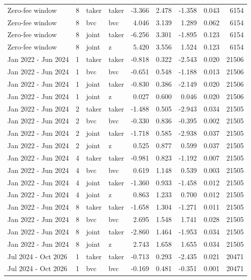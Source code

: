 \begin{tabular}{lrllrrrrr}
Zero-fee window & 8 & taker & taker & -3.366 & 2.478 & -1.358 & 0.043 & 6154 \\
Zero-fee window & 8 & bvc & bvc & 4.046 & 3.139 & 1.289 & 0.062 & 6154 \\
Zero-fee window & 8 & joint & taker & -6.256 & 3.301 & -1.895 & 0.123 & 6154 \\
Zero-fee window & 8 & joint & z & 5.420 & 3.556 & 1.524 & 0.123 & 6154 \\
Jan 2022 - Jun 2024 & 1 & taker & taker & -0.818 & 0.322 & -2.543 & 0.020 & 21506 \\
Jan 2022 - Jun 2024 & 1 & bvc & bvc & -0.651 & 0.548 & -1.188 & 0.013 & 21506 \\
Jan 2022 - Jun 2024 & 1 & joint & taker & -0.830 & 0.386 & -2.149 & 0.020 & 21506 \\
Jan 2022 - Jun 2024 & 1 & joint & z & 0.027 & 0.600 & 0.046 & 0.020 & 21506 \\
Jan 2022 - Jun 2024 & 2 & taker & taker & -1.488 & 0.505 & -2.943 & 0.034 & 21505 \\
Jan 2022 - Jun 2024 & 2 & bvc & bvc & -0.330 & 0.836 & -0.395 & 0.002 & 21505 \\
Jan 2022 - Jun 2024 & 2 & joint & taker & -1.718 & 0.585 & -2.938 & 0.037 & 21505 \\
Jan 2022 - Jun 2024 & 2 & joint & z & 0.525 & 0.877 & 0.599 & 0.037 & 21505 \\
Jan 2022 - Jun 2024 & 4 & taker & taker & -0.981 & 0.823 & -1.192 & 0.007 & 21505 \\
Jan 2022 - Jun 2024 & 4 & bvc & bvc & 0.619 & 1.148 & 0.539 & 0.003 & 21505 \\
Jan 2022 - Jun 2024 & 4 & joint & taker & -1.360 & 0.933 & -1.458 & 0.012 & 21505 \\
Jan 2022 - Jun 2024 & 4 & joint & z & 0.863 & 1.233 & 0.700 & 0.012 & 21505 \\
Jan 2022 - Jun 2024 & 8 & taker & taker & -1.658 & 1.304 & -1.271 & 0.011 & 21505 \\
Jan 2022 - Jun 2024 & 8 & bvc & bvc & 2.695 & 1.548 & 1.741 & 0.028 & 21505 \\
Jan 2022 - Jun 2024 & 8 & joint & taker & -2.860 & 1.464 & -1.953 & 0.034 & 21505 \\
Jan 2022 - Jun 2024 & 8 & joint & z & 2.743 & 1.658 & 1.655 & 0.034 & 21505 \\
Jul 2024 - Oct 2026 & 1 & taker & taker & -0.713 & 0.293 & -2.435 & 0.021 & 20471 \\
Jul 2024 - Oct 2026 & 1 & bvc & bvc & -0.169 & 0.481 & -0.351 & 0.001 & 20471 \\

\end{tabular}
